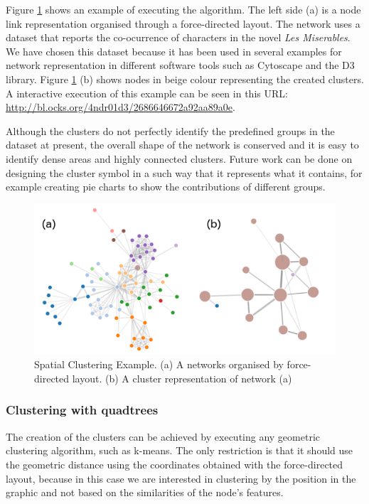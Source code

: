 Figure \ref{fig:spatial_clustring} shows an example of executing the algorithm. The left side (a) is a node link representation organised through a force-directed layout. The network uses a dataset that reports the co-ocurrence of characters in the novel \emph{Les Miserables}. We have chosen this dataset because it has been used in several examples for network representation in different software tools such as Cytoscape and the D3 library. Figure \ref{fig:spatial_clustring} (b) shows nodes in beige colour representing the created clusters. A interactive execution of this example can be seen in this URL: \url{http://bl.ocks.org/4ndr01d3/2686646672a92aa89a0e}. 

Although the clusters do not perfectly identify the predefined groups in the dataset at present, the overall shape of the network is conserved and it is easy to identify dense areas and highly connected clusters. Future work can be done on designing the cluster symbol in a such way that it represents what it contains, for example creating pie charts to show the contributions of different groups.

\begin{figure}[ht]
\centering
\includegraphics[width=\textwidth]{figures/spatial_clustring.png}
\caption[Spatial Clustering Example.]{Spatial Clustering Example. (a) A networks organised by force-directed layout. (b) A cluster representation of network (a)
\label{fig:spatial_clustring}}
\end{figure}

\subsubsection{Clustering with quadtrees}
The creation of the clusters can be achieved by executing any geometric clustering algorithm, such as k-means. The only restriction is that it should use the geometric distance using the coordinates obtained with the force-directed layout, because in this case we are interested in clustering by the position in the graphic and not based on the similarities of the node's features.


